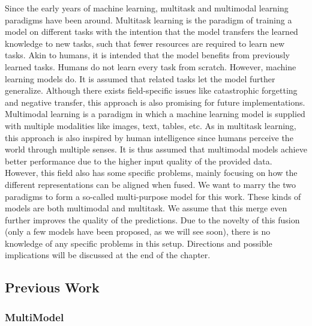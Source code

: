 \documentclass[
]{krantz}
\begin{document}
Since the early years of machine learning, multitask and multimodal learning paradigms have been around. Multitask learning \citet{Crawshaw2020} is the paradigm of training a model on different tasks with the intention that the model transfers the learned knowledge to new tasks, such that fewer resources are required to learn new tasks. Akin to humans, it is intended that the model benefits from previously learned tasks. Humans do not learn every task from scratch. However, machine learning models do. It is assumed that related tasks let the model further generalize. Although there exists field-specific issues like catastrophic forgetting and negative transfer, this approach is also promising for future implementations.
Multimodal learning \citet{Baltrusaitis2019} is a paradigm in which a machine learning model is supplied with multiple modalities like images, text, tables, etc. As in multitask learning, this approach is also inspired by human intelligence since humans perceive the world through multiple senses. It is thus assumed that multimodal models achieve better performance due to the higher input quality of the provided data. However, this field also has some specific problems, mainly focusing on how the different representations can be aligned when fused.
We want to marry the two paradigms to form a so-called multi-purpose model for this work. These kinds of models are both multimodal and multitask. We assume that this merge even further improves the quality of the predictions. Due to the novelty of this fusion (only a few models have been proposed, as we will see soon), there is no knowledge of any specific problems in this setup. Directions and possible implications will be discussed at the end of the chapter.

\hypertarget{previous-work}{%
\subsection{Previous Work}\label{previous-work}}

\hypertarget{multimodel}{%
\subsubsection{MultiModel}\label{multimodel}}
\end{document}

